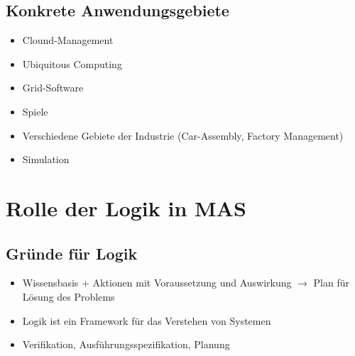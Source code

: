 \documentclass{article} %
\begin{document}
	\subsection{Konkrete Anwendungsgebiete}
	\begin{itemize}
		\item Clound-Management
		\item Ubiquitous Computing
		\item Grid-Software
		\item Spiele
		\item Verschiedene Gebiete der Industrie (Car-Assembly, Factory Management)
		\item Simulation
	\end{itemize}
\section{Rolle der Logik in MAS}
	\subsection{Gründe für Logik}
	\begin{itemize}
		\item Wissensbasis + Aktionen mit Voraussetzung und Auswirkung $\rightarrow$ Plan für Lösung des Problems
		\item Logik ist ein Framework für das Verstehen von Systemen
		\item Verifikation, Ausführungsspezifikation, Planung
	\end{itemize}
\end{document}
